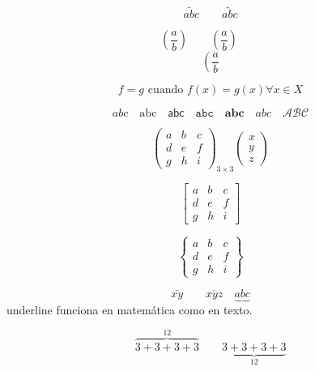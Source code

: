 \documentclass[12pt,a4paper]{report}
\numberwithin{equation}{section}
\begin{document}
$$
\tilde{abc}\qquad \widetilde{abc}
$$

$$
(\frac{a}{b})\qquad \left(\frac{a}{b}\right)\qquad 
$$%
$$
\left(\frac{a}{b}\right.
$$%

$$
f=g \mbox{ cuando } f(x)=g(x) \forall x\in X
$$%

$$
abc\quad\mathrm{abc}\quad\mathsf{abc}\quad\mathtt{abc}\quad\mathbf{abc}\quad\mathit{abc}\quad\mathcal{ABC}%
$$

$$%
\left(\begin{array}{ccc}%
 a & b & c \\
 d & e & f \\
 g & h & i
\end{array}\right)_{3\times 3} \left(\begin{array}{c}
x \\
y \\
z
\end{array}\right)%
$$

$$
\left[\begin{array}{ccc}
a & b & c \\
d & e & f \\
g & h & i
\end{array}\right]
$$


$$
\left\{\begin{array}{ccc}
a & b & c \\
d & e & f \\
g & h & i
\end{array}\right\}
$$

$$
\bar{xy}\qquad \overline{xyz}\quad\underbrace{abc} %
$$
underline funciona en matemática como en texto.

$$
\overbrace{3+3+3+3}^{12}\qquad\underbrace{3+3+3+3}_{12}
$$
\end{document}
